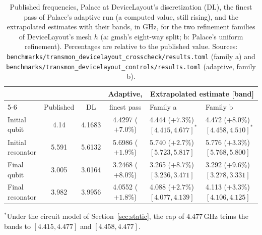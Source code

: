 \documentclass{anvil-paper}
\begin{document}
\begin{table}[htbp]
  \centering
  \caption{Published frequencies, Palace at DeviceLayout's discretization
  (DL), the finest pass of Palace's adaptive run (a computed value, still
  rising), and the extrapolated estimates with their bands, in GHz, for
  the two refinement families of DeviceLayout's mesh $h$ (a: gmsh's
  eight-way split; b: Palace's uniform refinement). Percentages are
  relative to the published value. Sources:
  \texttt{benchmarks/transmon\_devicelayout\_crosscheck/results.toml}
  (family a) and \texttt{benchmarks/transmon\_devicelayout\_controls/results.toml}
  (adaptive, family b).}
  \label{tab:crosscheck}
  \footnotesize
  \setlength{\tabcolsep}{3pt}
  \begin{tabular}{@{}lccc@{\hspace{6pt}}ll@{}}
    \toprule
    & & & Adaptive, & \multicolumn{2}{c}{Extrapolated estimate [band]} \\
    \cmidrule(l){5-6}
    & Published & DL & finest pass & Family a & Family b \\
    \midrule
    Initial qubit & 4.14 & 4.1683 & 4.4297 ($+7.0\%$) & 4.444 ($+7.3\%$) $[4.415, 4.677]^{\ast}$ & 4.472 ($+8.0\%$) $[4.458, 4.510]^{\ast}$ \\
    Initial resonator & 5.591 & 5.6132 & 5.6986 ($+1.9\%$) & 5.740 ($+2.7\%$) $[5.723, 5.817]$ & 5.776 ($+3.3\%$) $[5.768, 5.800]$ \\
    Final qubit & 3.005 & 3.0164 & 3.2468 ($+8.0\%$) & 3.265 ($+8.7\%$) $[3.236, 3.471]$ & 3.292 ($+9.6\%$) $[3.278, 3.331]$ \\
    Final resonator & 3.982 & 3.9956 & 4.0552 ($+1.8\%$) & 4.088 ($+2.7\%$) $[4.077, 4.139]$ & 4.113 ($+3.3\%$) $[4.106, 4.125]$ \\
    \bottomrule
  \end{tabular}

  \smallskip
  {\footnotesize $^{\ast}$Under the circuit model of
  Section~\ref{sec:static}, the cap of $4.477$\,GHz trims the bands to
  $[4.415, 4.477]$ and $[4.458, 4.477]$.}
\end{table}
\end{document}
